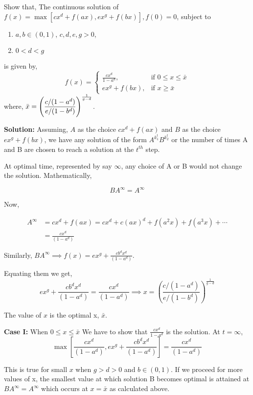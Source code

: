 \begin{example} Show that, The continuous solution of $f(x) = \max[cx^d + f(ax), ex^g + f(bx)], f(0) =0$, subject to 
\begin{enumerate}
    \item $a, b \in (0, 1)$, $c, d, e, g >0$,
    \item $0 < d<g$
\end{enumerate}
is given by, 
    \begin{equation*}
        f(x) = 
        \begin{cases}
            \frac{cx^d}{1-a^d}, & \text{if } 0 \le x \le \bar{x}\\
            ex^g+f(bx), & \text{if } x \ge \bar{x}
        \end{cases}
    \end{equation*}
where, $\bar{x} = \mathlarger{\left(\frac{c/(1-a^d)}{e/(1-b^d)}\right)^{\frac{1}{g-d}}}$.

\vspace{5mm}
\textbf{Solution:} Assuming, $A$ as the choice $cx^d + f(ax)$ and $B$ as the choice $ex^g + f(bx)$, we have any solution of the form $A^{k_1^t}B^{k_2^t}$ or the number of times A and B are chosen to reach a solution at the $t^{th}$ step.

At optimal time, represented by say $\infty$, any choice of A or B would not change the solution. Mathematically, 

$$BA^\infty = A^\infty$$

Now, 

\begin{align*}
    A^\infty &= cx^d + f(ax) = cx^d + c(ax)^d + f(a^2x) + f(a^3x) + \cdots \\
             &= \frac{cx^d}{(1-a^d)}
\end{align*}

Similarly, $BA^{\infty} \implies f(x) = ex^g + \frac{cb^dx^d}{(1-a^d)}$.

Equating them we get, 
$$
ex^g + \frac{cb^dx^d}{(1-a^d)} = \frac{cx^d}{(1-a^d)} \implies x = {\left(\frac{c/(1-a^d)}{e/(1-b^d)}\right)^{\frac{1}{g-d}}}
$$

The value of $x$ is the optimal x, $\bar{x}$.

\textbf{Case I:} When $0 \le x \le \bar{x}$ We have to show that $\frac{cx^d}{1-a^d}$ is the solution. At $t=\infty$,
$$
\max\left[\frac{cx^d}{(1-a^d)}, ex^g + \frac{cb^dx^d}{(1-a^d)}\right] = \frac{cx^d}{(1-a^d)}
$$

This is true for small $x$ when $g>d>0$ and $b \in (0, 1)$. If we proceed for more values of x, the smallest value at which solution B becomes optimal is attained at $BA^\infty=A^\infty$ which occurs at $x = \bar{x}$ as calculated above.


\end{example}
